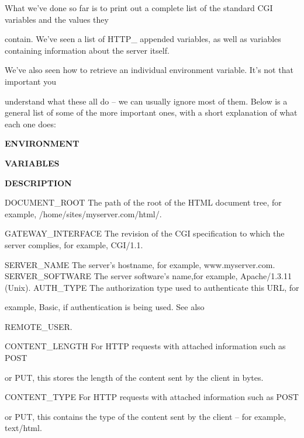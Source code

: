 \documentclass[a4paper,11pt]{book}
\begin{document}
\noindent 

\noindent 

\noindent What we've done so far is to print out a complete list of the standard CGI variables and the values they

\noindent contain. We've seen a list of HTTP\_ appended variables, as well as variables containing information about the server itself.

\noindent 

\noindent We've also seen how to retrieve an individual environment variable. It's not that important you

\noindent understand what these all do -- we can usually ignore most of them. Below is a general list of some of the more important ones, with a short explanation of what each one does:

\noindent 

\noindent 

\noindent \textbf{ENVIRONMENT}

\noindent \textbf{VARIABLES}

\noindent \textbf{DESCRIPTION}

\noindent 

\noindent DOCUMENT\_ROOT The path of the root of the HTML document tree, for example, /home/sites/myserver.com/html/.

\noindent 

\noindent GATEWAY\_INTERFACE The revision of the CGI specification to which the server complies, for example, CGI/1.1.

\noindent SERVER\_NAME The server's hostname, for example, www.myserver.com. SERVER\_SOFTWARE The server software's name,for example, Apache/1.3.11 (Unix). AUTH\_TYPE The authorization type used to authenticate this URL, for

\noindent example, Basic, if authentication is being used. See also

\noindent REMOTE\_USER.

\noindent 

\noindent CONTENT\_LENGTH For HTTP requests with attached information such as POST

\noindent or PUT, this stores the length of the content sent by the client in bytes.

\noindent 

\noindent CONTENT\_TYPE For HTTP requests with attached information such as POST

\noindent or PUT, this contains the type of the content sent by the client -- for example, text/html.
\end{document}
